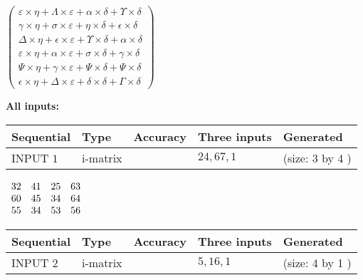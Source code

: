 \documentclass[12pt]{article}
\begin{document}
   
 $  \left( \begin{array}
 {
 c
 }
  \varepsilon \times  \eta +  \Lambda \times  \varepsilon +  \alpha \times  \delta +  \Upsilon \times  \delta \\ 
  \gamma \times  \eta +  \sigma \times  \varepsilon +  \eta \times  \delta +  \epsilon \times  \delta \\ 
  \Delta \times  \eta +  \epsilon \times  \varepsilon +  \Upsilon \times  \delta +  \alpha \times  \delta \\ 
  \varepsilon \times  \eta +  \alpha \times  \varepsilon +  \sigma \times  \delta +  \gamma \times  \delta \\ 
  \Psi \times  \eta +  \gamma \times  \varepsilon +  \Psi \times  \delta +  \Psi \times  \delta \\ 
  \epsilon \times  \eta +  \Delta \times  \varepsilon +  \delta \times  \delta +  \Gamma \times  \delta
 \end{array} \right) $ 
   
   
\noindent\vspace{0.1in}\hspace{-0.08in} {\textbf{\Large{All inputs: }}}
   
   
  
  
\noindent\begin{tabular}{|l|l|l|l|l|}
\hline
 Sequential & Type & Accuracy & Three inputs & Generated \\ 
\hline
 
 
  INPUT $            1 $ & i-matrix &  & $
 24
 , 
 67
 , 
 1
 $ & (size:            3  by            4 )
 \\  \hline  
 \end{tabular}
   
   
 $\begin{array}{
 c
 c
 c
 c
 }
          32  & 
          41  & 
          25  & 
          63  \\ 
          60  & 
          45  & 
          34  & 
          64  \\ 
          55  & 
          34  & 
          53  & 
          56
\end{array}  $ 
  
  
\noindent\begin{tabular}{|l|l|l|l|l|}
\hline
 Sequential & Type & Accuracy & Three inputs & Generated \\ 
\hline
 
 
  INPUT $            2 $ & i-matrix &  & $
 5
 , 
 16
 , 
 1
 $ & (size:            4  by            1 )
 \\  \hline  
 \end{tabular}
   
\end{document}
